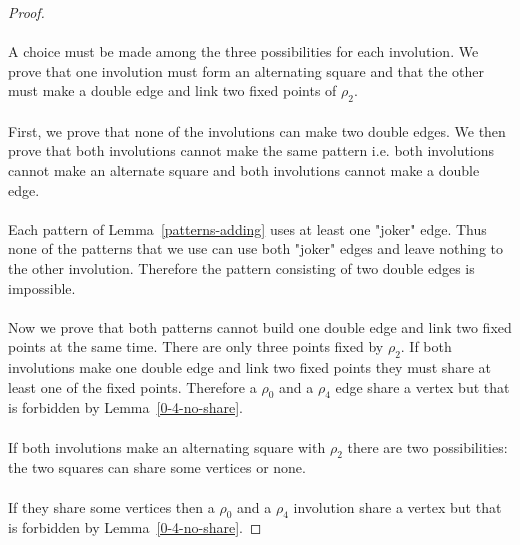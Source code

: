 \begin{proof}
\paragraph{}
A choice must be made among the three possibilities for each involution. We prove that one involution must form an alternating square and that the other must make a double edge and link two fixed points of $\rho_2$.

\paragraph{}
First, we prove that none of the involutions can make two double edges. We then prove that both involutions cannot make the same pattern i.e. both involutions cannot make an alternate square and both involutions cannot make a double edge.

\paragraph{}
Each pattern of Lemma~\ref{patterns-adding} uses at least one "joker" edge. Thus none of the patterns that we use can use both "joker" edges and leave nothing to the other involution. Therefore the pattern consisting of two double edges is impossible.

\paragraph{}
Now we prove that both patterns cannot build one double edge and link two fixed points at the same time. There are only three points fixed by $\rho_2$. If both involutions make one double edge and link two fixed points they must share at least one of the fixed points. Therefore a $\rho_0$ and a $\rho_4$ edge share a vertex but that is forbidden by Lemma~\ref{0-4-no-share}.

\paragraph{}
If both involutions make an alternating square with $\rho_2$ there are two possibilities: the two squares can share some vertices or none.


\paragraph{}
If they share some vertices then a $\rho_0$ and a $\rho_4$ involution share a vertex but that is forbidden by Lemma~\ref{0-4-no-share}.


\end{proof}

